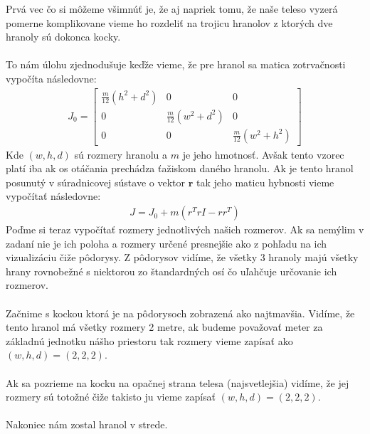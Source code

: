 \documentclass[a4paper]{article}
\begin{document}
	Prvá vec čo si môžeme všimnúť je, že aj napriek tomu, že naše teleso vyzerá pomerne komplikovane vieme ho rozdeliť na trojicu hranolov z ktorých dve hranoly sú dokonca kocky.
	\\
	\\
	To nám úlohu zjednodušuje keďže vieme, že pre hranol sa matica zotrvačnosti vypočíta následovne:
	\begin{align*}
		J_0 = \begin{bmatrix}
			\frac{m}{12}(h^2 + d^2) & 0 & 0 \\
			0 & \frac{m}{12}(w^2 + d^2) & 0 \\
			0 & 0 & \frac{m}{12}(w^2 + h^2)
		\end{bmatrix}
	\end{align*}
	Kde $(w, h, d)$ sú rozmery hranolu a $m$ je jeho hmotnosť. Avšak tento vzorec platí iba ak os otáčania prechádza ťažiskom daného hranolu. Ak je tento hranol posunutý v súradnicovej sústave o vektor $\boldsymbol{r}$ tak jeho maticu hybnosti vieme vypočítať následovne:
	\begin{align*}
		J = J_0 + m(r^TrI-rr^T)
	\end{align*}
	Poďme si teraz vypočítať rozmery jednotlivých našich rozmerov. Ak sa nemýlim v zadaní nie je ich poloha a rozmery určené presnejšie ako z pohľadu na ich vizualizáciu čiže pôdorysy. Z pôdorysov vidíme, že všetky 3 hranoly majú všetky hrany rovnobežné s niektorou zo štandardných osí čo uľahčuje určovanie ich rozmerov.
	\\
	\\
	Začnime s kockou ktorá je na pôdorysoch zobrazená ako najtmavšia. Vidíme, že tento hranol má všetky rozmery 2 metre, ak budeme považovať meter za základnú jednotku nášho priestoru tak rozmery vieme zapísať ako $(w, h, d) = (2, 2, 2)$. 
	\\
	\\
	Ak sa pozrieme na kocku na opačnej strana telesa (najsvetlejšia) vidíme, že jej rozmery sú totožné čiže takisto ju vieme zapísať $(w, h, d) = (2, 2, 2)$.
	\\
	\\
	Nakoniec nám zostal hranol v strede. 
\end{document}
